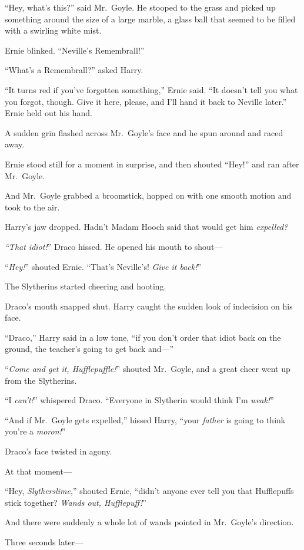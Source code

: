 “Hey, what’s this?” said Mr.~Goyle. He stooped to the grass and picked up something around the size of a large marble, a glass ball that seemed to be filled with a swirling white mist.

Ernie blinked. “Neville’s Remembrall!”

“What’s a Remembrall?” asked Harry.

“It turns red if you’ve forgotten something,” Ernie said. “It doesn’t tell you what you forgot, though. Give it here, please, and I’ll hand it back to Neville later.” Ernie held out his hand.

A sudden grin flashed across Mr.~Goyle’s face and he spun around and raced away.

Ernie stood still for a moment in surprise, and then shouted “Hey!” and ran after Mr.~Goyle.

And Mr.~Goyle grabbed a broomstick, hopped on with one smooth motion and took to the air.

Harry’s jaw dropped. Hadn’t Madam Hooch said that would get him \emph{expelled?}

\emph{“That idiot!}” Draco hissed. He opened his mouth to shout—

“\emph{Hey!}” shouted Ernie. “That’s Neville’s! \emph{Give it back!}”

The Slytherins started cheering and hooting.

Draco’s mouth snapped shut. Harry caught the sudden look of indecision on his face.

“Draco,” Harry said in a low tone, “if you don’t order that idiot back on the ground, the teacher’s going to get back and—”

“\emph{Come and get it, Hufflepuffle!}” shouted Mr.~Goyle, and a great cheer went up from the Slytherins.

“I \emph{can’t!}” whispered Draco. “Everyone in Slytherin would think I’m \emph{weak!}”

“And if Mr.~Goyle gets expelled,” hissed Harry, “your \emph{father} is going to think you’re a \emph{moron!}”

Draco’s face twisted in agony.

At that moment—

“Hey, \emph{Slytherslime},” shouted Ernie, “didn’t anyone ever tell you that Hufflepuffs stick together? \emph{Wands out, Hufflepuff!}”

And there were suddenly a whole lot of wands pointed in Mr.~Goyle’s direction.

Three seconds later—

